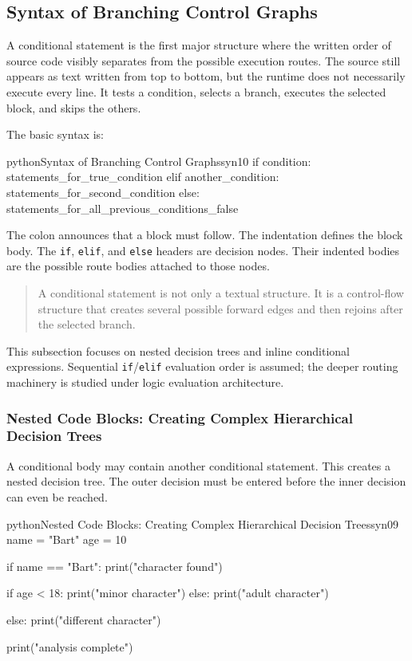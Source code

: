\subsection{Syntax of Branching Control Graphs}

A conditional statement is the first major structure where the written order of source code visibly separates from the possible execution routes. The source still appears as text written from top to bottom, but the runtime does not necessarily execute every line. It tests a condition, selects a branch, executes the selected block, and skips the others.

The basic syntax is:

\begin{codebox}[]{python}{Syntax of Branching Control Graphs}{syn10}
if condition:
    statements_for_true_condition
elif another_condition:
    statements_for_second_condition
else:
    statements_for_all_previous_conditions_false
\end{codebox}


The colon announces that a block must follow. The indentation defines the block body. The \texttt{if}, \texttt{elif}, and \texttt{else} headers are decision nodes. Their indented bodies are the possible route bodies attached to those nodes.

\begin{quote}
A conditional statement is not only a textual structure. It is a control-flow structure that creates several possible forward edges and then rejoins after the selected branch.
\end{quote}

This subsection focuses on nested decision trees and inline conditional expressions. Sequential \texttt{if}/\texttt{elif} evaluation order is assumed; the deeper routing machinery is studied under logic evaluation architecture.

\subsubsection{Nested Code Blocks: Creating Complex Hierarchical Decision Trees}

A conditional body may contain another conditional statement. This creates a nested decision tree. The outer decision must be entered before the inner decision can even be reached.

\begin{codebox}[]{python}{Nested Code Blocks: Creating Complex Hierarchical Decision Trees}{syn09}
name = "Bart"
age = 10

if name == "Bart":
    print("character found")

    if age < 18:
        print("minor character")
    else:
        print("adult character")

else:
    print("different character")

print("analysis complete")
\end{codebox}


